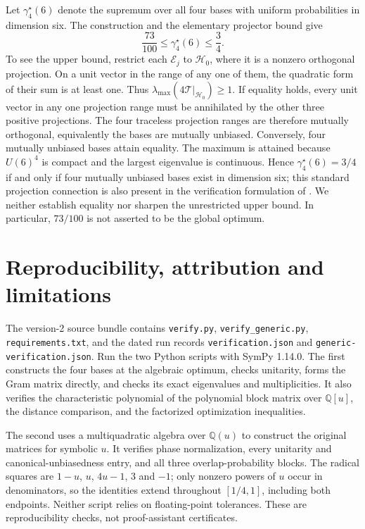 \documentclass[11pt,a4paper]{article}
\theoremstyle{remark}
\newcommand{\E}{\mathcal E}
\newcommand{\T}{\mathcal T}
\newcommand{\HH}{\mathcal H_0}
\begin{document}
Let $\gamma_4^\star(6)$ denote the supremum over all four bases with uniform probabilities in dimension six. The construction and the elementary projector bound give
\begin{equation}\label{eq:globalbounds}
 \frac{73}{100}\le\gamma_4^\star(6)\le\frac34.
\end{equation}
To see the upper bound, restrict each $\E_j$ to $\HH$, where it is a nonzero orthogonal projection. On a unit vector in the range of any one of them, the quadratic form of their sum is at least one. Thus $\lambda_{\max}(4\T|_{\HH})\ge1$.
If equality holds, every unit vector in any one projection range must be annihilated by the other three positive projections. The four traceless projection ranges are therefore mutually orthogonal, equivalently the bases are mutually unbiased. Conversely, four mutually unbiased bases attain equality. The maximum is attained because $U(6)^4$ is compact and the largest eigenvalue is continuous. Hence $\gamma_4^\star(6)=3/4$ if and only if four mutually unbiased bases exist in dimension six; this standard projection connection is also present in the verification formulation of \cite{zhu}. We neither establish equality nor sharpen the unrestricted upper bound. In particular, $73/100$ is not asserted to be the global optimum.

\section{Reproducibility, attribution and limitations}
The version-2 source bundle contains \texttt{verify.py}, \texttt{verify\_generic.py}, \texttt{requirements.txt}, and the dated run records \texttt{verification.json} and \texttt{generic-verification.json}. Run the two Python scripts with SymPy 1.14.0. The first constructs the four bases at the algebraic optimum, checks unitarity, forms the Gram matrix directly, and checks its exact eigenvalues and multiplicities. It also verifies the characteristic polynomial of the polynomial block matrix over $\mathbb Q[u]$, the distance comparison, and the factorized optimization inequalities.

The second uses a multiquadratic algebra over $\mathbb Q(u)$ to construct the original matrices for symbolic $u$. It verifies phase normalization, every unitarity and canonical-unbiasedness entry, and all three overlap-probability blocks. The radical squares are $1-u$, $u$, $4u-1$, $3$ and $-1$; only nonzero powers of $u$ occur in denominators, so the identities extend throughout $[1/4,1]$, including both endpoints. Neither script relies on floating-point tolerances. These are reproducibility checks, not proof-assistant certificates.
\end{document}
